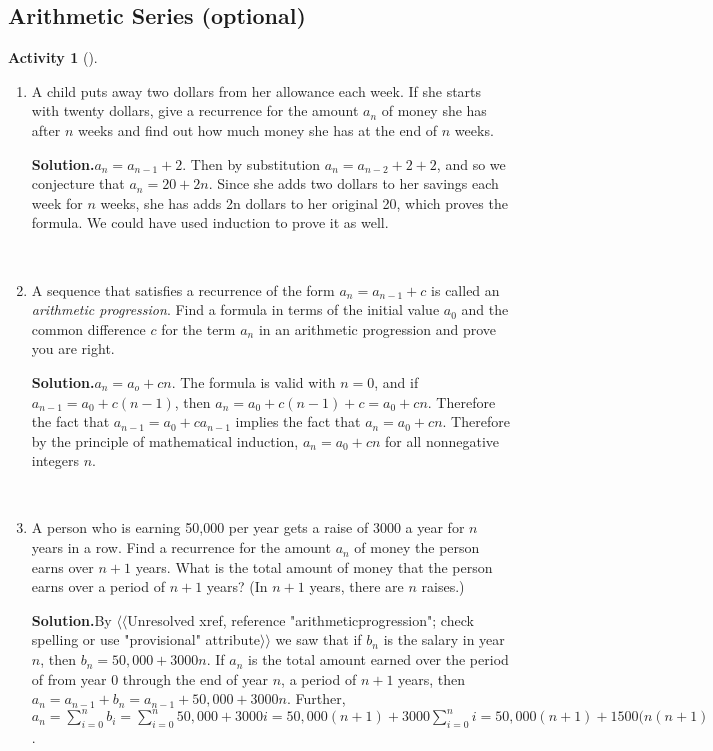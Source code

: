 \documentclass[10pt,]{book}
\theoremstyle{plain}
\theoremstyle{definition}
\newtheorem{activity}[project]{Activity}
\numberwithin{equation}{chapter}
\begin{document}
\typeout{************************************************}
\typeout{************************************************}
\subsection[{Arithmetic Series (optional)}]{Arithmetic Series (optional)}\label{subsection-18}
\begin{activity}[]\label{childsaving}
~\par
\begin{enumerate}[label=(\alph*)]
 \item A child puts away two dollars from her allowance each week. If she starts with twenty dollars, give a recurrence for the amount \(a_n\) of money she has after \(n\) weeks and find out how much money she has at the end of \(n\) weeks.%
\par\medskip\noindent%
\textbf{Solution.}\quad \(a_n=a_{n-1} +2\). Then by substitution \(a_n=a_{n-2}+2+2\), and so we conjecture that \(a_n = 20 +2n\). Since she adds two dollars to her savings each week for \(n\) weeks, she has adds 2n dollars to her original 20, which proves the formula. We could have used induction to prove it as well.%

~\par
\item A sequence that satisfies a recurrence of the form \(a_n=a_{n-1} +c\) is called an \emph{arithmetic progression}. Find a formula in terms of the initial value \(a_0\) and the common difference \(c\) for the term \(a_n\) in an arithmetic progression and prove you are right.%
\par\medskip\noindent%
\textbf{Solution.}\quad \(a_n =a_o+cn\). The formula is valid with \(n=0\), and if \(a_{n-1}=a_0
+c(n-1)\), then \(a_n = a_0 +c(n-1) +c =a_0+cn\). Therefore the fact that \(a_{n-1}=a_0+ca_{n-1}\) implies the fact that \(a_n=a_0+cn\). Therefore by the principle of mathematical induction, \(a_n=a_0+cn\) for all nonnegative integers \(n\).%

~\par
\item A person who is earning \textdollar{}50,000 per year gets a raise of \textdollar{}3000 a year for \(n\) years in a row. Find a recurrence for the amount \(a_n\) of money the person earns over \(n+1\) years. What is the total amount of money that the person earns over a period of \(n+1\) years? (In \(n+1\) years, there are \(n\) raises.)%
\par\medskip\noindent%
\textbf{Solution.}\quad By {$\langle\langle$Unresolved xref, reference "arithmeticprogression"; check spelling or use "provisional" attribute$\rangle\rangle$} we saw that if \(b_n\) is the salary in year \(n\), then \(b_n=50,000 + 3000n\). If \(a_n\) is the total amount earned over the period of from year 0 through the end of year \(n\), a period of \(n+1\) years, then \(a_n=a_{n-1}+b_n=a_{n-1}+ 50,000+3000n\). Further, \(a_n=\sum_{i=0}^n b_i=\sum_{i=0}^n50,000 +3000i = 50,000(n+1)+3000\sum_{i=0}^n
i= 50,000(n+1) + 1500(n(n+1)\).%


\end{enumerate}
\end{activity}
\end{document}
